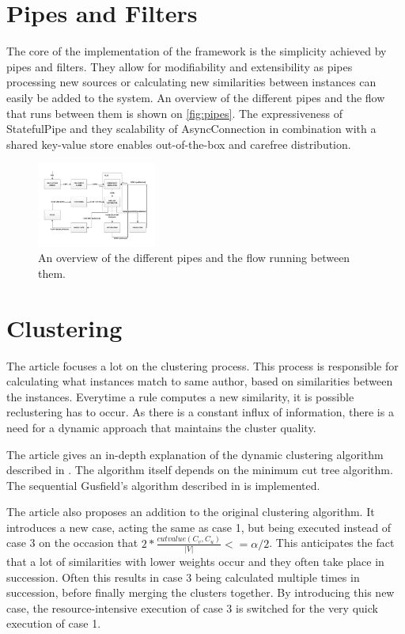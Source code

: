\documentclass[9pt, twocolumn]{phdsymp} %
\begin{document}
\section{Pipes and Filters}
\label{pipes}

The core of the implementation of the framework is the simplicity achieved by pipes and filters. They allow for modifiability and extensibility as pipes processing new sources or calculating new similarities between instances can easily be added to the system. An overview of the different pipes and the flow that runs between them is shown on \autoref{fig:pipes}. The expressiveness of StatefulPipe and they scalability of AsyncConnection in combination with a shared key-value store enables out-of-the-box and carefree distribution.

\begin{figure}[hb!]
	\centering
	\includegraphics[width= 0.35\textwidth]{fig/completepipesmall.pdf}
	\caption{An overview of the different pipes and the flow running between them.}
	\label{fig:pipes}
\end{figure}

\section{Clustering}

The article focuses a lot on the clustering process. This process is responsible for calculating what instances match to same author, based on similarities between the instances. Everytime a rule computes a new similarity, it is possible reclustering has to occur. As there is a constant influx of information, there is a need for a dynamic approach that maintains the cluster quality. 

The article gives an in-depth explanation of the dynamic clustering algorithm described in \cite{dyncluster}. The algorithm itself depends on the minimum cut tree algorithm. The sequential Gusfield's algorithm described in \cite{gusfield} is implemented. 

The article also proposes an addition to the original clustering algorithm. It introduces a new case, acting the same as case 1, but being executed instead of case 3 on the occasion that $2 * \frac{cutvalue(C_v, C_u)}{\left|V\right|} <= \alpha / 2$. This anticipates the fact that a lot of similarities with lower weights occur and they often take place in succession. Often this results in case 3 being calculated multiple times in succession, before finally merging the clusters together. By introducing this new case, the resource-intensive execution of case 3 is switched for the very quick execution of case 1.
\end{document}
